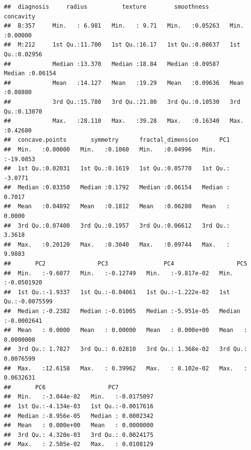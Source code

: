\documentclass[
  11pt,
]{article}
\newenvironment{Shaded}{\begin{snugshade}}{\end{snugshade}}
\newcommand{\AttributeTok}[1]{\textcolor[rgb]{0.77,0.63,0.00}{#1}}
\newcommand{\FunctionTok}[1]{\textcolor[rgb]{0.00,0.00,0.00}{#1}}
\newcommand{\NormalTok}[1]{#1}
\newcommand{\OtherTok}[1]{\textcolor[rgb]{0.56,0.35,0.01}{#1}}
\newcommand{\SpecialCharTok}[1]{\textcolor[rgb]{0.00,0.00,0.00}{#1}}
\begin{document}
\begin{verbatim}
##  diagnosis     radius          texture        smoothness        concavity      
##  B:357     Min.   : 6.981   Min.   : 9.71   Min.   :0.05263   Min.   :0.00000  
##  M:212     1st Qu.:11.700   1st Qu.:16.17   1st Qu.:0.08637   1st Qu.:0.02956  
##            Median :13.370   Median :18.84   Median :0.09587   Median :0.06154  
##            Mean   :14.127   Mean   :19.29   Mean   :0.09636   Mean   :0.08880  
##            3rd Qu.:15.780   3rd Qu.:21.80   3rd Qu.:0.10530   3rd Qu.:0.13070  
##            Max.   :28.110   Max.   :39.28   Max.   :0.16340   Max.   :0.42680  
##  concave.points       symmetry      fractal_dimension      PC1          
##  Min.   :0.00000   Min.   :0.1060   Min.   :0.04996   Min.   :-19.0853  
##  1st Qu.:0.02031   1st Qu.:0.1619   1st Qu.:0.05770   1st Qu.: -3.0771  
##  Median :0.03350   Median :0.1792   Median :0.06154   Median :  0.7017  
##  Mean   :0.04892   Mean   :0.1812   Mean   :0.06280   Mean   :  0.0000  
##  3rd Qu.:0.07400   3rd Qu.:0.1957   3rd Qu.:0.06612   3rd Qu.:  3.3618  
##  Max.   :0.20120   Max.   :0.3040   Max.   :0.09744   Max.   :  9.9883  
##       PC2               PC3                PC4                  PC5            
##  Min.   :-9.6077   Min.   :-0.12749   Min.   :-9.817e-02   Min.   :-0.0501920  
##  1st Qu.:-1.9337   1st Qu.:-0.04061   1st Qu.:-1.222e-02   1st Qu.:-0.0075599  
##  Median :-0.2382   Median :-0.01005   Median :-5.951e-05   Median :-0.0002641  
##  Mean   : 0.0000   Mean   : 0.00000   Mean   : 0.000e+00   Mean   : 0.0000000  
##  3rd Qu.: 1.7827   3rd Qu.: 0.02810   3rd Qu.: 1.368e-02   3rd Qu.: 0.0076599  
##  Max.   :12.6158   Max.   : 0.39962   Max.   : 8.102e-02   Max.   : 0.0632631  
##       PC6                  PC7            
##  Min.   :-3.044e-02   Min.   :-0.0175097  
##  1st Qu.:-4.134e-03   1st Qu.:-0.0017616  
##  Median :-8.956e-05   Median : 0.0002342  
##  Mean   : 0.000e+00   Mean   : 0.0000000  
##  3rd Qu.: 4.320e-03   3rd Qu.: 0.0024175  
##  Max.   : 2.505e-02   Max.   : 0.0108129
\end{verbatim}

\begin{Shaded}
\end{Shaded}
\end{document}
